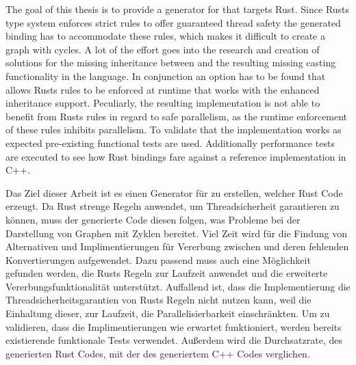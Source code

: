 \documentclass[thesis]{subfiles}
\begin{document}
{
\let\cleardoublepage\relax


The goal of this thesis is to provide a generator for  that targets Rust.
Since Rusts type system enforces strict rules to offer guaranteed thread safety the generated binding has to accommodate these rules, which makes it difficult to create a graph with cycles.
A lot of the effort goes into the research and creation of solutions for the missing inheritance between \structs and the resulting missing casting functionality in the language.
In conjunction an option has to be found that allows Rusts rules to be enforced at runtime that works with the enhanced inheritance support.
Peculiarly, the resulting implementation is not able to benefit from Rusts rules in regard to safe parallelism, as the runtime enforcement of these rules inhibits parallelism.
To validate that the implementation works as expected pre-existing functional tests are used.
Additionally performance tests are executed to see how Rust bindings fare against a reference implementation in C++.

}


Das Ziel dieser Arbeit ist es einen Generator für  zu erstellen, welcher Rust Code erzeugt.
Da Rust strenge Regeln anwendet, um Threadsicherheit garantieren zu können, muss der generierte Code diesen folgen, was Probleme bei der Darstellung von Graphen mit Zyklen bereitet.
Viel Zeit wird für die Findung von Alternativen und Implimentierungen für Vererbung zwischen \structs und deren fehlenden Konvertierungen aufgewendet.
Dazu passend muss auch eine Möglichkeit gefunden werden, die Rusts Regeln zur Laufzeit anwendet und die erweiterte Vererbungsfunktionalität unterstützt.
Auffallend ist, dass die Implementierung die Threadsicherheitsgarantien von Rusts Regeln  nicht nutzen kann, weil die Einhaltung dieser, zur Laufzeit, die Parallelisierbarkeit einschränkten.
Um zu validieren, dass die Implimentierungen wie erwartet funktioniert, werden bereits existierende funktionale Tests verwendet.
Außerdem wird die Durchsatzrate, des generierten Rust Codes, mit der des generiertem C++ Codes verglichen.
\end{document}
